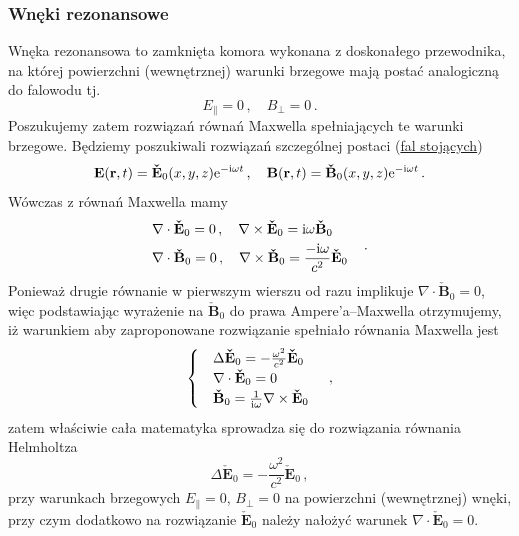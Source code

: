 \documentclass[../main.tex]{subfiles}
\begin{document}
\subsubsection{Wnęki rezonansowe}
Wnęka rezonansowa to zamknięta komora wykonana z doskonałego przewodnika, na której powierzchni
(wewnętrznej) warunki brzegowe mają postać analogiczną do falowodu tj.
\begin{equation*}
    E_\parallel=0\,,\quad B_\perp=0\,.
\end{equation*}
Poszukujemy zatem rozwiązań równań Maxwella spełniających te warunki brzegowe. Będziemy poszukiwali
rozwiązań szczególnej postaci (\underline{fal stojących})
\begin{equation*}
    \mathbf{E}(\mathbf{r},t)=\mathbf{\check E}_0(x,y,z)\mathrm{e}^{-\mathrm{i}\omega t}\,,\quad \mathbf{B}(\mathbf{r},t)=\mathbf{\check B}_0(x,y,z)\mathrm{e}^{-\mathrm{i}\omega t}\,.
\end{equation*}
Wówczas z równań Maxwella mamy
\begin{equation*}
    \begin{split}
        &\nabla\cdot\mathbf{\check E}_0=0\,,\quad \nabla\times\mathbf{\check E}_0=\mathrm{i}\omega\mathbf{\check B}_0\\
        &\nabla\cdot\mathbf{\check B}_0=0\,,\quad \nabla\times\mathbf{\check B}_0=\frac{-\mathrm{i}\omega}{c^2}\mathbf{\check E}_0
    \end{split}\quad\,.
\end{equation*}
Ponieważ drugie równanie w pierwszym wierszu od razu implikuje \(\nabla\cdot\mathbf{\check B}_0=0\),
więc podstawiając wyrażenie na \(\mathbf{\check B}_0\) do prawa Ampere'a--Maxwella otrzymujemy, iż
warunkiem aby zaproponowane rozwiązanie spełniało równania Maxwella jest
\begin{equation*}
    \begin{cases}
        &\Delta\mathbf{\check E}_0=-\frac{\omega^2}{c^2}\mathbf{\check{E}}_0\\
        &\nabla\cdot\mathbf{\check E}_0=0\\
        &\mathbf{\check B}_0=\frac{1}{\mathrm{i}\omega}\nabla\times\mathbf{\check E}_0
    \end{cases}\quad\,,
\end{equation*}
zatem właściwie cała matematyka sprowadza się do rozwiązania równania Helmholtza
\begin{equation*}
    \Delta\mathbf{\check E}_0=-\frac{\omega^2}{c^2}\mathbf{\check{E}}_0\,,
\end{equation*}
przy warunkach brzegowych \(E_\parallel=0\), \(B_\perp=0\) na powierzchni (wewnętrznej) wnęki, przy
czym dodatkowo na rozwiązanie \(\mathbf{\check E}_0\) należy nałożyć warunek
\(\nabla\cdot\mathbf{\check E}_0=0\). 
\end{document}
